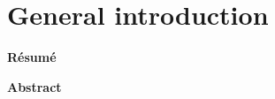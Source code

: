 \ifdefined{}
\else
\setcounter{chapter}{0} %
\dominitoc
\faketableofcontents
\fi

\chapter{General introduction}


\textbf{Résumé}

\textbf{Abstract}


\clearpage
\minitoc



